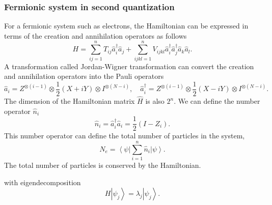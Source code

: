 \documentclass[11pt]{article}
\newcommand{\bra}[1]{\left\langle #1\right|}
\newcommand{\ket}[1]{\left|#1\right\rangle}
\begin{document}
\subsubsection*{Fermionic system in second quantization}
For a fermionic system such as electrons, the Hamiltonian can be expressed in terms of the creation and annihilation operators as follows
\begin{equation}
    H = \sum_{ij=1}^{n}T_{ij}\hat{a}_i^{\dagger}\hat{a}_j + \sum_{ijkl=1}^{n}V_{ijkl}\hat{a}_i^{\dagger}\hat{a}_j^{\dagger}\hat{a}_k\hat{a}_l.
\end{equation}
A transformation called Jordan-Wigner transformation can convert the creation and annihilation operators into the Pauli operators 
\begin{equation}
    \hat{a}_i = Z^{\otimes(i-1)}\otimes\frac{1}{2}(X + iY)\otimes I^{\otimes(N-i)}, \quad \hat{a}_i^{\dagger} = Z^{\otimes(i-1)}\otimes\frac{1}{2}(X - iY)\otimes I^{\otimes(N-i)}.
\end{equation}
The dimension of the Hamiltonian matrix $\hat{H}$ is also $2^n$. We can define the number operator $\hat{n}_i$
\begin{equation}
    \hat{n}_i = \hat{a}_i^{\dagger}\hat{a}_i = \frac{1}{2}(I - Z_i).
\end{equation}
This number operator can define the total number of particles in the system, 
\begin{equation}
    N_e = \bra{\psi}\sum_{i=1}^{n}\hat{n}_i\ket{\psi}.
\end{equation}
The total number of particles is conserved by the Hamiltonian. 

with eigendecomposition 
\begin{equation}
    H\ket{\psi_j} = \lambda_j\ket{\psi_j}.
\end{equation}



\end{document}
